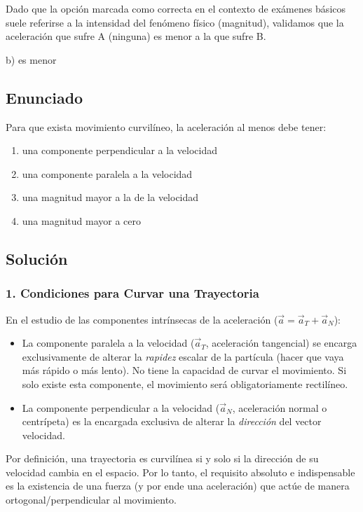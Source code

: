 \documentclass[12pt, a4paper]{article}
\begin{document}
Dado que la opción marcada como correcta en el contexto de exámenes básicos suele referirse a la intensidad del fenómeno físico (magnitud), validamos que la aceleración que sufre A (ninguna) es menor a la que sufre B.

\begin{tcolorbox}[colback=green!5!white, colframe=green!50!black, title=Respuesta Final]
\centering \Large b) es menor
\end{tcolorbox}

\newpage

\subsection*{Enunciado}
Para que exista movimiento curvilíneo, la aceleración al menos debe tener:
\begin{enumerate}[label=\alph*)]
    \item una componente perpendicular a la velocidad
    \item una componente paralela a la velocidad
    \item una magnitud mayor a la de la velocidad
    \item una magnitud mayor a cero
\end{enumerate}

\subsection*{Solución}

\subsubsection*{1. Condiciones para Curvar una Trayectoria}
En el estudio de las componentes intrínsecas de la aceleración ($\vec{a} = \vec{a}_T + \vec{a}_N$):
\begin{itemize}
    \item La componente paralela a la velocidad ($\vec{a}_T$, aceleración tangencial) se encarga exclusivamente de alterar la \textit{rapidez} escalar de la partícula (hacer que vaya más rápido o más lento). No tiene la capacidad de curvar el movimiento. Si solo existe esta componente, el movimiento será obligatoriamente rectilíneo.
    \item La componente perpendicular a la velocidad ($\vec{a}_N$, aceleración normal o centrípeta) es la encargada exclusiva de alterar la \textit{dirección} del vector velocidad.
\end{itemize}
Por definición, una trayectoria es curvilínea si y solo si la dirección de su velocidad cambia en el espacio. Por lo tanto, el requisito absoluto e indispensable es la existencia de una fuerza (y por ende una aceleración) que actúe de manera ortogonal/perpendicular al movimiento.
\end{document}
